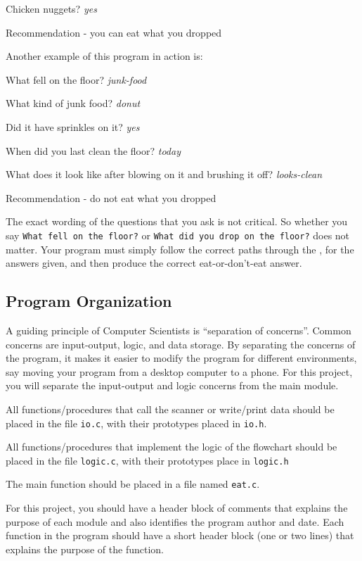 \documentclass[12pt]{article}
\begin{document}
{\color{blue} Chicken nuggets?} {\color{red} {\it yes}}

{\color{blue} Recommendation - you can eat what you dropped}

Another example of this program in action is:

{\color{blue} What fell on the floor?} {\color{red} {\it junk-food}}

{\color{blue} What kind of junk food?} {\color{red} {\it donut}}

{\color{blue} Did it have sprinkles on it?} {\color{red} {\it yes}}

{\color{blue} When did you last clean the floor?} {\color{red} {\it today}}

{\color{blue} What does it look like after blowing on it and brushing it off?} {\color{red} {\it looks-clean}}

{\color{blue} Recommendation - do not eat what you dropped }

The exact wording of the questions that you ask is not critical.  So whether you
say {\tt What fell on the floor?} or {\tt What did you drop on the floor?} does
not matter.  Your program must simply follow the correct paths through the
,
for the answers given, and then produce the correct eat-or-don't-eat answer.

\subsection*{Program Organization}

A guiding principle of 
Computer Scientists
is ``separation of concerns''. Common concerns are input-output,
logic, and data storage. By separating the concerns of the
program, it makes it easier to modify the program for different environments,
say moving your program from a desktop computer to a phone.
For this project, you will separate the input-output and logic concerns
from the main module.

All functions/procedures that call the scanner
or write/print data should be placed in
the file \verb!io.c!, with their prototypes placed in \verb!io.h!.

All functions/procedures that implement the logic of the flowchart should
be placed in the file \verb!logic.c!,
with their prototypes place in \verb!logic.h!

The main function should be placed in a file named \verb!eat.c!.

For this project, you should have a header block of comments that explains the
purpose of each module and also identifies the program author and date.  Each 
function in the program should have a short header block (one or two lines) that
explains the purpose of the function.
\end{document}
